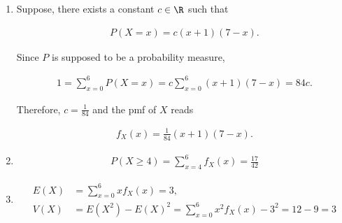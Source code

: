 \begin{solution}

\phantom{}

\begin{enumerate}[label = (\alph*)]

    \item Suppose, there exists a constant $c \in \R$ such that
    
    \begin{align*}
        P(X = x) = c (x + 1) (7 - x).
    \end{align*}

    Since $P$ is supposed to be a probability measure,

    \begin{align*}
        1 = \sum_{x=0}^6 P(X = x) = c \sum_{x=0}^6 (x + 1) (7 - x) = 84 c.
    \end{align*}

    Therefore, $c = \frac{1}{84}$ and the pmf of $X$ reads

    \begin{align*}
        f_X(x) = \frac{1}{84} (x + 1) (7 - x).
    \end{align*}

    \item

    \begin{align*}
        P(X \geq 4) = \sum_{x=4}^6 f_X(x) = \frac{17}{42}
    \end{align*}

    \item

    \begin{align*}
        E(X) & = \sum_{x=0}^6 x f_X(x) = 3, \\
        V(X) & = E(X^2) - E(X)^2 = \sum_{x=0}^6 x^2 f_X(x) - 3^2 = 12 - 9 = 3
    \end{align*}

\end{enumerate}
    
\end{solution}

